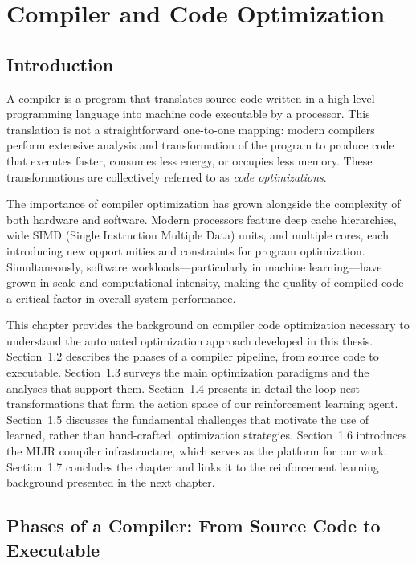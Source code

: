 \chapter{Compiler and Code Optimization}
\label{ch:compiler-optimization}

\section{Introduction}

A compiler is a program that translates source code written in a high-level programming language into machine code executable by a processor. This translation is not a straightforward one-to-one mapping: modern compilers perform extensive analysis and transformation of the program to produce code that executes faster, consumes less energy, or occupies less memory. These transformations are collectively referred to as \textit{code optimizations}.

The importance of compiler optimization has grown alongside the complexity of both hardware and software. Modern processors feature deep cache hierarchies, wide SIMD (Single Instruction Multiple Data) units, and multiple cores, each introducing new opportunities and constraints for program optimization. Simultaneously, software workloads—particularly in machine learning—have grown in scale and computational intensity, making the quality of compiled code a critical factor in overall system performance.

This chapter provides the background on compiler code optimization necessary to understand the automated optimization approach developed in this thesis. Section~1.2 describes the phases of a compiler pipeline, from source code to executable. Section~1.3 surveys the main optimization paradigms and the analyses that support them. Section~1.4 presents in detail the loop nest transformations that form the action space of our reinforcement learning agent. Section~1.5 discusses the fundamental challenges that motivate the use of learned, rather than hand-crafted, optimization strategies. Section~1.6 introduces the MLIR compiler infrastructure, which serves as the platform for our work. Section~1.7 concludes the chapter and links it to the reinforcement learning background presented in the next chapter.

\section{Phases of a Compiler: From Source Code to Executable}

